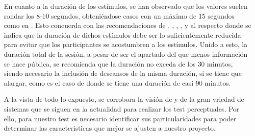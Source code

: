 \documentclass[11pt,a4paper]{book}
\begin{document}
    En cuanto a la duración de los estímulos, se han observado que los valores suelen rondar los 8-10 segundos, obteniéndose casos con un máximo de 15 segundos como en \cite{2005IWitew}. Esto concuerda con las recomendaciones de \cite{UIT1116}, \cite{UIT1534}, \cite{UIT1284}, \cite{EBU3286}, \cite{UIT1285} y \cite{UIT1286} al respecto donde se indica que la duración de dichos estímulos debe ser lo suficientemente reducida para evitar que los participantes se acostumbren a los estímulos. Unido a esto, la duración total de la sesión, a pesar de ser el apartado del que menos información se hace pública, se recomienda que la duración no exceda de los 30 minutos, siendo necesario la inclusión de descansos de la misma duración, si se tiene que alargar, como es el caso de \cite{2019LKritly} donde se tiene una duración de casi 90 minutos.\newline
    
    A la vista de todo lo expuesto, se corrobora la visión de \cite{Tejada2020} y \cite{delaPrida2021} de la gran vriedad de sistemas que se siguen en la actualidad para realizar los test perceptuales. Por ello, para nuestro test es necesario identificar sus particularidades para poder determinar las características que mejor se ajusten a nuestro proyecto.
    
    
    
    
\end{document}
